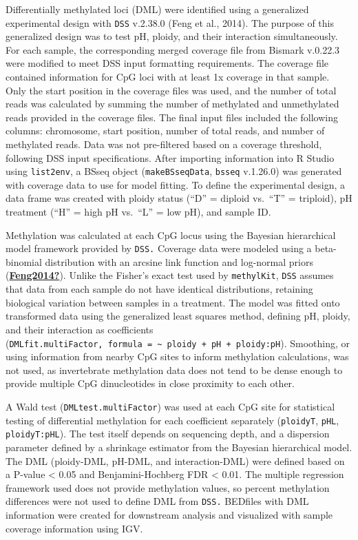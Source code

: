 \documentclass [11pt, proquest] {uwthesis}[2015/03/03]
\begin{document}
Differentially methylated loci (DML) were identified using a generalized experimental design with \texttt{DSS} v.2.38.0 (Feng et al., 2014). The purpose of this generalized design was to test pH, ploidy, and their interaction simultaneously. For each sample, the corresponding merged coverage file from Bismark v.0.22.3 were modified to meet DSS input formatting requirements. The coverage file contained information for CpG loci with at least 1x coverage in that sample. Only the start position in the coverage files was used, and the number of total reads was calculated by summing the number of methylated and unmethylated reads provided in the coverage files. The final input files included the following columns: chromosome, start position, number of total reads, and number of methylated reads. Data was not pre-filtered based on a coverage threshold, following DSS input specifications. After importing information into R Studio using \texttt{list2env}, a BSseq object (\texttt{makeBSseqData}, \texttt{bsseq} v.1.26.0) was generated with coverage data to use for model fitting. To define the experimental design, a data frame was created with ploidy status (``D'' = diploid vs.~``T'' = triploid), pH treatment (``H'' = high pH vs.~``L'' = low pH), and sample ID.

Methylation was calculated at each CpG locus using the Bayesian hierarchical model framework provided by \texttt{DSS.} Coverage data were modeled using a beta-binomial distribution with an arcsine link function and log-normal priors (\protect\hyperlink{ref-Feng2014}{\textbf{Feng2014?}}). Unlike the Fisher's exact test used by \texttt{methylKit}, \texttt{DSS} assumes that data from each sample do not have identical distributions, retaining biological variation between samples in a treatment. The model was fitted onto transformed data using the generalized least squares method, defining pH, ploidy, and their interaction as coefficients (\texttt{DMLfit.multiFactor,\ formula\ =\ \textasciitilde{}\ ploidy\ +\ pH\ +\ ploidy:pH}). Smoothing, or using information from nearby CpG sites to inform methylation calculations, was not used, as invertebrate methylation data does not tend to be dense enough to provide multiple CpG dinucleotides in close proximity to each other.

A Wald test (\texttt{DMLtest.multiFactor}) was used at each CpG site for statistical testing of differential methylation for each coefficient separately (\texttt{ploidyT}, \texttt{pHL}, \texttt{ploidyT:pHL}). The test itself depends on sequencing depth, and a dispersion parameter defined by a shrinkage estimator from the Bayesian hierarchical model. The DML (ploidy-DML, pH-DML, and interaction-DML) were defined based on a P-value \textless{} 0.05 and Benjamini-Hochberg FDR \textless{} 0.01. The multiple regression framework used does not provide methylation values, so percent methylation differences were not used to define DML from \texttt{DSS.} BEDfiles with DML information were created for downstream analysis and visualized with sample coverage information using IGV.
\end{document}
